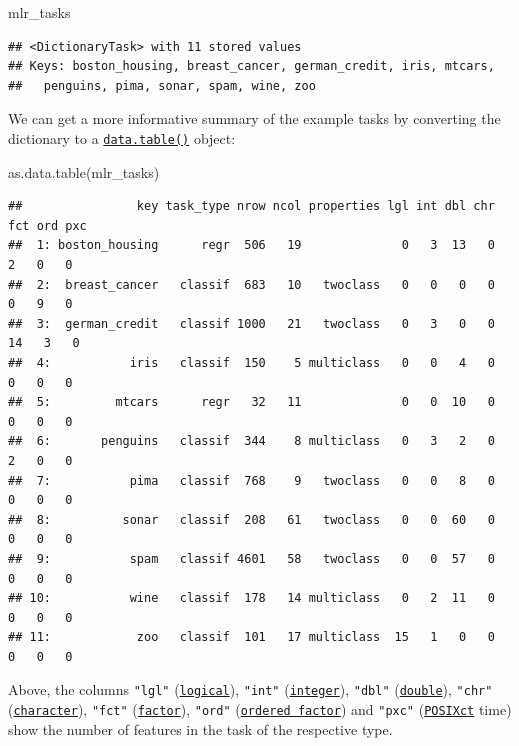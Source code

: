 \documentclass[
]{scrbook}
\newenvironment{Shaded}{\begin{snugshade}}{\end{snugshade}}
\newcommand{\FunctionTok}[1]{\textcolor[rgb]{0.00,0.00,0.00}{#1}}
\newcommand{\NormalTok}[1]{#1}
\renewenvironment{Shaded} {\begin{snugshade}\small} {\end{snugshade}}
\begin{document}
\begin{Shaded}
\begin{Highlighting}[]
\NormalTok{mlr\_tasks}
\end{Highlighting}
\end{Shaded}

\begin{verbatim}
## <DictionaryTask> with 11 stored values
## Keys: boston_housing, breast_cancer, german_credit, iris, mtcars,
##   penguins, pima, sonar, spam, wine, zoo
\end{verbatim}

We can get a more informative summary of the example tasks by converting the dictionary to a \href{https://www.rdocumentation.org/packages/data.table/topics/data.table-package}{\texttt{data.table()}} object:

\begin{Shaded}
\begin{Highlighting}[]
\FunctionTok{as.data.table}\NormalTok{(mlr\_tasks)}
\end{Highlighting}
\end{Shaded}

\begin{verbatim}
##                key task_type nrow ncol properties lgl int dbl chr fct ord pxc
##  1: boston_housing      regr  506   19              0   3  13   0   2   0   0
##  2:  breast_cancer   classif  683   10   twoclass   0   0   0   0   0   9   0
##  3:  german_credit   classif 1000   21   twoclass   0   3   0   0  14   3   0
##  4:           iris   classif  150    5 multiclass   0   0   4   0   0   0   0
##  5:         mtcars      regr   32   11              0   0  10   0   0   0   0
##  6:       penguins   classif  344    8 multiclass   0   3   2   0   2   0   0
##  7:           pima   classif  768    9   twoclass   0   0   8   0   0   0   0
##  8:          sonar   classif  208   61   twoclass   0   0  60   0   0   0   0
##  9:           spam   classif 4601   58   twoclass   0   0  57   0   0   0   0
## 10:           wine   classif  178   14 multiclass   0   2  11   0   0   0   0
## 11:            zoo   classif  101   17 multiclass  15   1   0   0   0   0   0
\end{verbatim}

Above, the columns \texttt{"lgl"} (\href{https://www.rdocumentation.org/packages/base/topics/logical}{\texttt{logical}}), \texttt{"int"} (\href{https://www.rdocumentation.org/packages/base/topics/integer}{\texttt{integer}}), \texttt{"dbl"} (\href{https://www.rdocumentation.org/packages/base/topics/double}{\texttt{double}}), \texttt{"chr"} (\href{https://www.rdocumentation.org/packages/base/topics/character}{\texttt{character}}), \texttt{"fct"} (\href{https://www.rdocumentation.org/packages/base/topics/factor}{\texttt{factor}}), \texttt{"ord"} (\href{https://www.rdocumentation.org/packages/base/topics/factor}{\texttt{ordered\ factor}}) and \texttt{"pxc"} (\href{https://www.rdocumentation.org/packages/base/topics/DateTimeClasses}{\texttt{POSIXct}} time) show the number of features in the task of the respective type.
\end{document}
